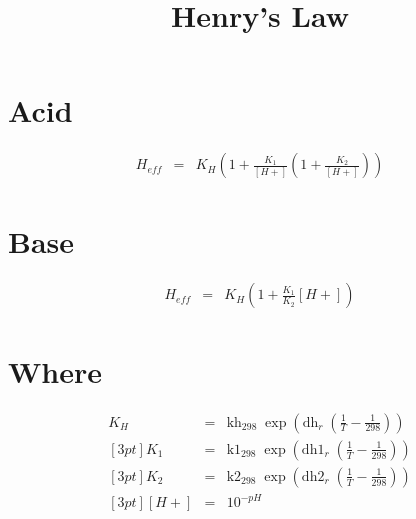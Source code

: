 \documentclass[11pt, oneside]{article}   	%
\title{Henry's Law}
\date{}							%
\begin{document}
\maketitle
\section*{Acid}
\begin{eqnarray*}
H_{eff} &=& K_H \left(1 + \frac{K_1}{[H+]}\left(1 + \frac{K_2 }{ [H+]}\right)\right)
\end{eqnarray*}
\section*{Base}
\begin{eqnarray*}
H_{eff} &=& K_H \left(1 + \frac{K_1}{K_2}{[H+]}\right)
\end{eqnarray*}
\section*{Where}
\begin{eqnarray*}
K_H&=&\mbox{kh}_{298} \; \exp(\mbox{dh}_r \;(\frac{1}{T}-\frac{1}{298})) \\ [3pt]
K_1&=&\mbox{k1}_{298} \; \exp(\mbox{dh1}_r \;(\frac{1}{T}-\frac{1}{298})) \\ [3pt]
K_2&=&\mbox{k2}_{298} \; \exp(\mbox{dh2}_r \;(\frac{1}{T}-\frac{1}{298})) \\ [3pt]
{[H+]} &=& 10^{-pH}
\end{eqnarray*}
\end{document}

